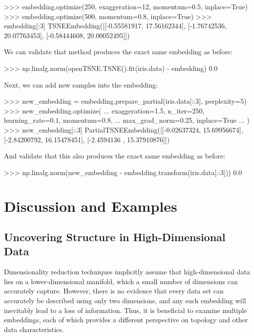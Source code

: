 \documentclass[article]{jss}
\begin{document}
\begin{CodeChunk}
\begin{CodeInput}
>>> embedding.optimize(250, exaggeration=12, momentum=0.5, inplace=True)
>>> embedding.optimize(500, momentum=0.8, inplace=True)
>>> embedding[:3]
TSNEEmbedding([[-0.55581917, 17.56162344],
               [-1.76742536, 20.07763453],
               [-0.58444608, 20.00052495]])
\end{CodeInput}
\end{CodeChunk}
We can validate that method produces the exact same embedding as before:
\begin{CodeChunk}
\begin{CodeInput}
>>> np.linalg.norm(openTSNE.TSNE().fit(iris.data) - embedding)
0.0
\end{CodeInput}
\end{CodeChunk}
Next, we can add new samples into the embedding:
\begin{CodeChunk}
\begin{CodeInput}
>>> new_embedding = embedding.prepare_partial(iris.data[::3], perplexity=5)
>>> new_embedding.optimize(
...     exaggeration=1.5, n_iter=250, learning_rate=0.1, momentum=0.8,
...     max_grad_norm=0.25, inplace=True
... )
>>> new_embedding[::3]
PartialTSNEEmbedding([[-0.02637324, 15.69956674],
                      [-2.84200792, 16.15478451],
                      [-2.4594136 , 15.37910876]])
\end{CodeInput}
\end{CodeChunk}
And validate that this also produces the exact same embedding as before:
\begin{CodeChunk}
\begin{CodeInput}
>>> np.linalg.norm(new_embedding - embedding.transform(iris.data[::3]))
0.0
\end{CodeInput}
\end{CodeChunk}

\section{Discussion and Examples} \label{sec:discussion}

\subsection{Uncovering Structure in High-Dimensional Data}

Dimensionality reduction techniques implicitly assume that high-dimensional data
lies on a lower-dimensional manifold, which a small number of dimensions can
accurately capture. However, there is no evidence that every data set can
accurately be described using only two dimensions, and any such embedding will
inevitably lead to a loss of information. Thus, it is beneficial to examine
multiple embeddings, each of which provides a different perspective on topology
and other data characteristics.
\end{document}

